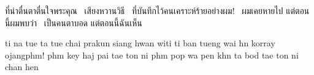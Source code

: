 ที่น่าตื่นตาตื่นใจพระคุณ 
เสียงหวานวิธี 
ที่บันทึกไว้คนเคราะห์ร้ายอย่างผม! 
ผมเคยหายไป แต่ตอนนี้ผมพบว่า  
เป็นคนตาบอด แต่ตอนนี้ฉันเห็น 

ti na tue ta tue chai prakun
siang hwan witi ti ban
tueng wai hn korray ojangphm!
phm key haj pai tae ton ni
phm pop wa pen khn ta bod
tae ton ni chan hen
